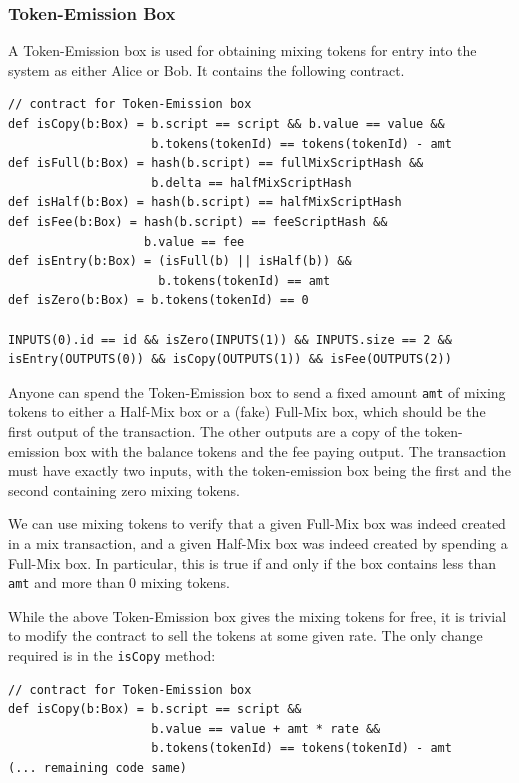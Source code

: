 \documentclass[11pt]{article}
\begin{document}
\subsubsection{Token-Emission Box}

A Token-Emission box is used for obtaining mixing tokens for entry into the system as either Alice or Bob. It contains the following contract. 

\begin{Verbatim}[frame=single]
// contract for Token-Emission box
def isCopy(b:Box) = b.script == script && b.value == value &&
                    b.tokens(tokenId) == tokens(tokenId) - amt
def isFull(b:Box) = hash(b.script) == fullMixScriptHash && 
                    b.delta == halfMixScriptHash
def isHalf(b:Box) = hash(b.script) == halfMixScriptHash
def isFee(b:Box) = hash(b.script) == feeScriptHash &&
                   b.value == fee
def isEntry(b:Box) = (isFull(b) || isHalf(b)) && 
                     b.tokens(tokenId) == amt
def isZero(b:Box) = b.tokens(tokenId) == 0

INPUTS(0).id == id && isZero(INPUTS(1)) && INPUTS.size == 2 &&
isEntry(OUTPUTS(0)) && isCopy(OUTPUTS(1)) && isFee(OUTPUTS(2))
\end{Verbatim}

Anyone can spend the Token-Emission box to send a fixed amount \texttt{amt} of mixing tokens to either a Half-Mix box or a (fake) Full-Mix box, which should be the first output of the transaction. The other outputs are a copy of the token-emission box with the balance tokens and the fee paying output. The transaction must have exactly two inputs, with the token-emission box being the first and the second containing zero mixing tokens. 

We can use mixing tokens to verify that a given Full-Mix box was indeed created in a mix transaction, and a given Half-Mix box was indeed created by spending a Full-Mix box. In particular, this is true if and only if the box contains less than \texttt{amt} and more than 0 mixing tokens.  

While the above Token-Emission box gives the mixing tokens for free, it is trivial to modify the contract to sell the tokens at some given rate. The only change required is in the \texttt{isCopy} method:

\begin{Verbatim}[frame=single]
// contract for Token-Emission box
def isCopy(b:Box) = b.script == script && 
                    b.value == value + amt * rate &&
                    b.tokens(tokenId) == tokens(tokenId) - amt
(... remaining code same)
\end{Verbatim}
\end{document}
